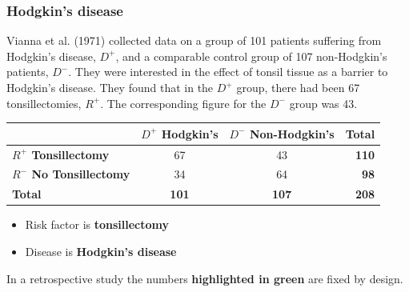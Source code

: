 \documentclass[a4paper]{article}\usepackage[]{graphicx}\usepackage[]{xcolor}
\begin{document}
\subsubsection{Hodgkin's disease}
Vianna et al. (1971) collected data on a group of 101 patients suffering from Hodgkin's disease, \textcolor{mygreen}{\( D^+ \)}, and a comparable control group of 107 non-Hodgkin's patients, \textcolor{mygreen}{\( D^- \)}.  They were interested in the effect of tonsil tissue as a barrier to Hodgkin's disease. They found that in the \textcolor{mygreen}{\( D^+ \)} group, there had been 67 tonsillectomies, \textcolor{myred}{\( R^+ \)}. The corresponding figure for the \textcolor{mygreen}{\( D^- \)} group was 43.
\begin{table}[H]
	\centering
	\begin{tabular}{@{}lccr@{}}
	\toprule
				 										   & \textcolor{mygreen}{\textbf{\( D^+ \) Hodgkin's}} & \textcolor{mygreen}{\textbf{\( D^- \) Non-Hodgkin's}} & \textbf{Total}    \\ \midrule
	\textcolor{myred}{\textbf{\( R^+ \) Tonsillectomy}}    & 67    		  									   & 43        		                                       & \textbf{110}  \\
	\textcolor{myred}{\textbf{\( R^- \) No Tonsillectomy}} & 34    		  									   & 64      		                                       & \textbf{98} \\ \midrule
	\textbf{Total} 										   & \textcolor{mygreen}{\textbf{101}}				   & \textcolor{mygreen}{\textbf{107}}                     & \textbf{208} \\ \bottomrule
	\end{tabular}
\end{table}
\begin{itemize}
	\item Risk factor is \textcolor{myred}{\textbf{tonsillectomy}}
	\item Disease is \textcolor{mygreen}{\textbf{Hodgkin's disease}}
\end{itemize}
In a retrospective study the numbers \textcolor{mygreen}{\textbf{highlighted in green}} are fixed by design.
\end{document}
